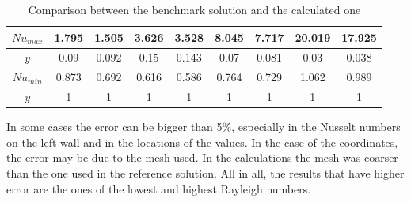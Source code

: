 \begin{table}[h]
\begin{tabular}{c|c|c|c|c|c|c|c|c|}
		\multicolumn{1}{|c|}{$Nu_{max}$} & 1.795                    & 1.505                & 3.626                   & 3.528                & 8.045                   & 7.717                & 20.019                   & 17.925               \\ \hline
		\multicolumn{1}{|c|}{$y$}     & 0.09                      & 0.092                & 0.15                      & 0.143                & 0.07                      & 0.081                & 0.03                      & 0.038               \\ \hline
		\multicolumn{1}{|c|}{$Nu_{min}$} & 0.873                  & 0.692                & 0.616                  & 0.586                & 0.764                  & 0.729                & 1.062                   & 0.989                \\ \hline
		\multicolumn{1}{|c|}{$y$}     & 1                         & 1                    & 1                         & 1                    & 1                         & 1                    & 1                         & 1                    \\ \hline
	\end{tabular}
\caption[Comparison between the benchmark solution and the calculated one]{Comparison between the benchmark solution and the calculated one \cite{DeVahlDavis1983}}
\label{ComparisonDiffHeated}
\end{table}

In some cases the error can be bigger than 5\%, especially in the Nusselt numbers on the left wall and in the locations of the values. In the case of the coordinates, the error may be due to the mesh used. In the calculations the mesh was coarser than the one used in the reference solution. All in all, the results that have higher error are the ones of the lowest and highest Rayleigh numbers.